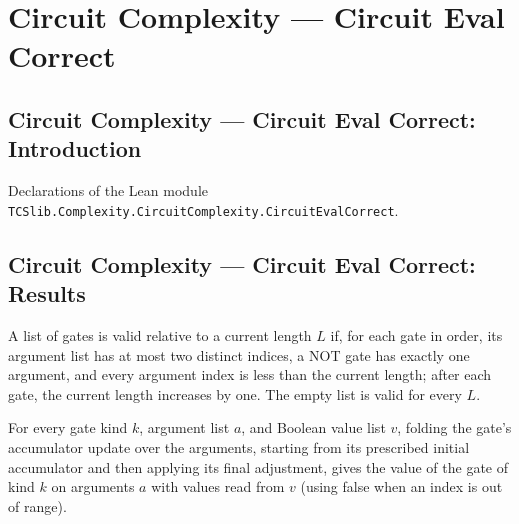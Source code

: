 \section{Circuit Complexity --- Circuit Eval Correct}
\subsection*{Circuit Complexity --- Circuit Eval Correct: Introduction}

Declarations of the Lean module \texttt{TCSlib.Complexity.CircuitComplexity.CircuitEvalCorrect}.

\subsection*{Circuit Complexity --- Circuit Eval Correct: Results}

\begin{definition}
\label{BoolCircuit.CircuitEval.GatesOK}
\leanok
{}
A list of gates is valid relative to a current length $L$ if, for each gate in order,
its argument list has at most two distinct indices, a NOT gate has exactly one argument,
and every argument index is less than the current length; after each gate, the current
length increases by one. The empty list is valid for every $L$.
\end{definition}

\begin{theorem}
\label{BoolCircuit.CircuitEval.accFin_foldl}
\leanok
{}
For every gate kind $k$, argument list $a$, and Boolean value list $v$, folding the
gate’s accumulator update over the arguments, starting from its prescribed initial
accumulator and then applying its final adjustment, gives the value of the gate of kind
$k$ on arguments $a$ with values read from $v$ (using false when an index is out of
range).
\end{theorem}

